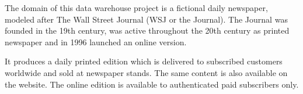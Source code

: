 
The domain of this data warehouse project is a fictional daily newspaper, modeled after The Wall Street Journal (WSJ or the Journal).
The Journal was founded in the 19th century, was active throughout the 20th century as printed newspaper and in 1996 launched an online version.

It produces a daily printed edition which is delivered to subscribed customers worldwide and sold at newspaper stands. The same content is also available on the website. The online edition is available to authenticated paid subscribers only.

